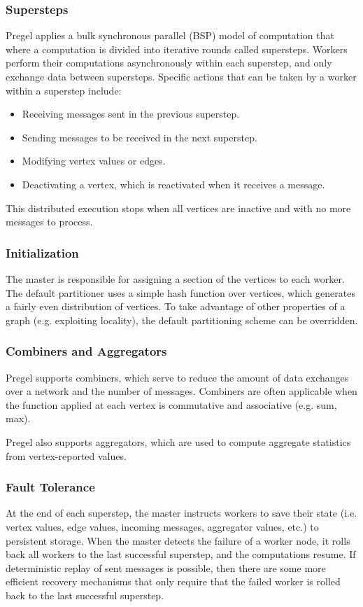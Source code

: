 \documentclass[12pt,titlepage]{article}
\begin{document}
      \subsubsection{Supersteps}
        Pregel applies a bulk synchronous parallel (BSP) model of computation that where a computation is divided into iterative rounds called supersteps. Workers
        perform their computations asynchronously within each superstep, and only exchange data between supersteps. Specific actions that can be taken by a worker
        within a superstep include:
        \begin{itemize}
          \item Receiving messages sent in the previous superstep.
          \item Sending messages to be received in the next superstep.
          \item Modifying vertex values or edges.
          \item Deactivating a vertex, which is reactivated when it receives a message.
        \end{itemize}

        This distributed execution stops when all vertices are inactive and with no more messages to process.

      \subsubsection{Initialization}
        The master is responsible for assigning a section of the vertices to each worker. The default partitioner uses a simple hash function over vertices,
        which generates a fairly even distribution of vertices. To take advantage of other properties of a graph (e.g. exploiting locality), the default
        partitioning scheme can be overridden.

      \subsubsection{Combiners and Aggregators}
        Pregel supports combiners, which serve to reduce the amount of data exchanges over a network and the number of messages. Combiners are often applicable
        when the function applied at each vertex is commutative and associative (e.g. sum, max).

        Pregel also supports aggregators, which are used to compute aggregate statistics from vertex-reported values.

      \subsubsection{Fault Tolerance}
        At the end of each superstep, the master instructs workers to save their state (i.e. vertex values, edge values, incoming messages, aggregator values, etc.)
        to persistent storage. When the master detects the failure of a worker node, it rolls back all workers to the last successful superstep, and the computations
        resume. If deterministic replay of sent messages is possible, then there are some more efficient recovery mechanisms that only require that the failed worker
        is rolled back to the last successful superstep.
\end{document}
